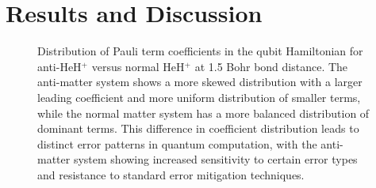 \documentclass[10pt,twocolumn,a4paper]{article}
\begin{document}
\section{Results and Discussion}

\begin{figure}[t!]
    \centering
    \caption{Distribution of Pauli term coefficients in the qubit Hamiltonian for anti-HeH$^+$ versus normal HeH$^+$ at 1.5 Bohr bond distance. The anti-matter system shows a more skewed distribution with a larger leading coefficient and more uniform distribution of smaller terms, while the normal matter system has a more balanced distribution of dominant terms. This difference in coefficient distribution leads to distinct error patterns in quantum computation, with the anti-matter system showing increased sensitivity to certain error types and resistance to standard error mitigation techniques.}
    \label{fig:hamiltonian_distribution}
\end{figure}
\end{document}
